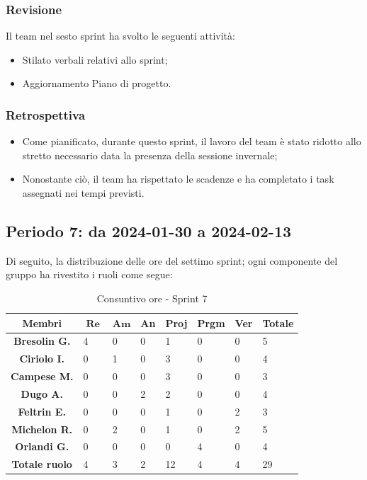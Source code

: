 \documentclass[10pt, a4paper]{article}
\begin{document}
\subsubsection{Revisione}
Il team nel sesto sprint ha svolto le seguenti attività:
\begin{itemize}
    \item Stilato verbali relativi allo sprint;
    \item Aggiornamento Piano di progetto.
\end{itemize}
\subsubsection{Retrospettiva}
\begin{itemize}
    \item Come pianificato, durante questo sprint, il lavoro del team è stato ridotto allo stretto necessario
    data la presenza della sessione invernale;
    \item Nonostante ciò, il team ha rispettato le scadenze e ha completato i task assegnati nei tempi previsti.
\end{itemize}

\subsection{Periodo 7: da 2024-01-30 a 2024-02-13}
Di seguito, la distribuzione delle ore del settimo sprint; ogni componente del gruppo ha rivestito i ruoli come segue:
\begin{table}[H]
    \begin{tabularx}{\textwidth}{c|X|X|X|X|X|X|X}
        \textbf{Membri} & $\operatorname{\textbf{Re}}$ & $\mathrm{\textbf{Am}}$ & \textbf{An} & \textbf{Proj} & \textbf{Prgm} & \textbf{Ver} & \textbf{Totale} \\
        \hline
        \textbf{Bresolin G.} & 4 & 0 & 0 & 1 & 0 & 0 & 5 \\
        \hline
        \textbf{Ciriolo I.}  & 0 & 1 & 0 & 3 & 0 & 0 & 4 \\
        \hline
        \textbf{Campese M.}  & 0 & 0 & 0 & 3 & 0 & 0 & 3 \\
        \hline
        \textbf{Dugo A.}     & 0 & 0 & 2 & 2 & 0 & 0 & 4 \\
        \hline
        \textbf{Feltrin E.}  & 0 & 0 & 0 & 1 & 0 & 2 & 3 \\
        \hline
        \textbf{Michelon R.} & 0 & 2 & 0 & 1 & 0 & 2 & 5 \\
        \hline
        \textbf{Orlandi G.}  & 0 & 0 & 0 & 0 & 4 & 0 & 4 \\
        \hline
        \textbf{Totale ruolo} & 4 & 3 & 2 & 12 & 4 & 4 & 29 \\
    \end{tabularx}
    \caption{Consuntivo ore - Sprint 7}
\end{table}
\end{document}
